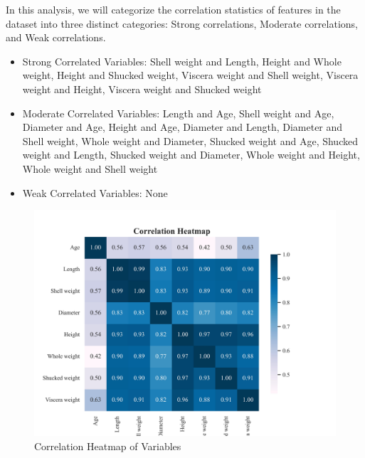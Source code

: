 \documentclass{article}
\begin{document}
\begin{minipage}[t]{0.5\linewidth}
    In this analysis, we will categorize the correlation statistics of features in the dataset into three distinct categories: Strong correlations, Moderate correlations, and Weak correlations.

\begin{itemize}
\item Strong Correlated Variables: Shell weight and Length, Height and Whole weight, Height and Shucked weight, Viscera weight and Shell weight, Viscera weight and Height, Viscera weight and Shucked weight
\item Moderate Correlated Variables: Length and Age, Shell weight and Age, Diameter and Age, Height and Age, Diameter and Length, Diameter and Shell weight, Whole weight and Diameter, Shucked weight and Age, Shucked weight and Length, Shucked weight and Diameter, Whole weight and Height, Whole weight and Shell weight
\item Weak Correlated Variables: None
\end{itemize}
\vfill
\end{minipage}
\hfill
\begin{minipage}[t]{0.5\linewidth}
    \begin{figure}[H]
        \centering
        \vspace{-1.5cm}
        \includegraphics[width=\linewidth]{./demo_data/20241104_132155/Abalone/output_graph/eda_corr.jpg}
        \caption{\label{fig:corr}Correlation Heatmap of Variables}
    \end{figure}
\end{minipage}
\end{document}
